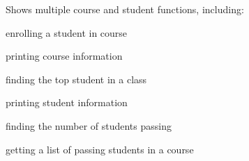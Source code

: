 Shows multiple course and student functions, including\+:
\begin{DoxyItemize}
\item enrolling a student in course
\item printing course information
\item finding the top student in a class
\item printing student information
\item finding the number of students passing
\item getting a list of passing students in a course 
\end{DoxyItemize}